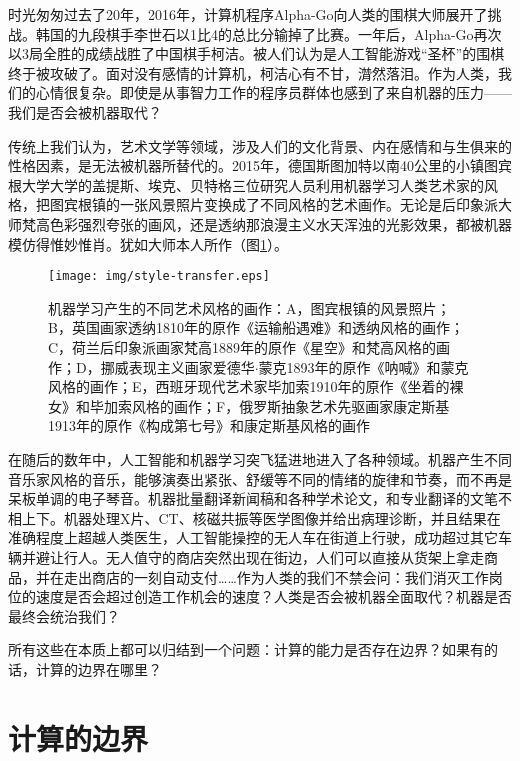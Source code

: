 \documentclass{article}
\begin{document}
时光匆匆过去了20年，2016年，计算机程序Alpha-Go向人类的围棋大师展开了挑战。韩国的九段棋手李世石以1比4的总比分输掉了比赛。一年后，Alpha-Go再次以3局全胜的成绩战胜了中国棋手柯洁。被人们认为是人工智能游戏“圣杯”的围棋终于被攻破了。面对没有感情的计算机，柯洁心有不甘，潸然落泪。作为人类，我们的心情很复杂。即使是从事智力工作的程序员群体也感到了来自机器的压力——我们是否会被机器取代？

传统上我们认为，艺术文学等领域，涉及人们的文化背景、内在感情和与生俱来的性格因素，是无法被机器所替代的。2015年，德国斯图加特以南40公里的小镇图宾根大学大学的盖提斯、埃克、贝特格三位研究人员利用机器学习人类艺术家的风格，把图宾根镇的一张风景照片变换成了不同风格的艺术画作\cite{Gatys-2015}。无论是后印象派大师梵高色彩强烈夸张的画风，还是透纳那浪漫主义水天浑浊的光影效果，都被机器模仿得惟妙惟肖。犹如大师本人所作（图\ref{fig:style-transfer}）。

\begin{figure}[htbp]
 \centering
 \texttt{[image: img/style-transfer.eps]}
 \caption{机器学习产生的不同艺术风格的画作：A，图宾根镇的风景照片；B，英国画家透纳1810年的原作《运输船遇难》和透纳风格的画作；C，荷兰后印象派画家梵高1889年的原作《星空》和梵高风格的画作；D，挪威表现主义画家爱德华$\cdot$蒙克1893年的原作《呐喊》和蒙克风格的画作；E，西班牙现代艺术家毕加索1910年的原作《坐着的裸女》和毕加索风格的画作；F，俄罗斯抽象艺术先驱画家康定斯基1913年的原作《构成第七号》和康定斯基风格的画作}
 \label{fig:style-transfer}
\end{figure}

在随后的数年中，人工智能和机器学习突飞猛进地进入了各种领域。机器产生不同音乐家风格的音乐，能够演奏出紧张、舒缓等不同的情绪的旋律和节奏，而不再是呆板单调的电子琴音。机器批量翻译新闻稿和各种学术论文，和专业翻译的文笔不相上下。机器处理X片、CT、核磁共振等医学图像并给出病理诊断，并且结果在准确程度上超越人类医生，人工智能操控的无人车在街道上行驶，成功超过其它车辆并避让行人。无人值守的商店突然出现在街边，人们可以直接从货架上拿走商品，并在走出商店的一刻自动支付……作为人类的我们不禁会问：我们消灭工作岗位的速度是否会超过创造工作机会的速度？人类是否会被机器全面取代？机器是否最终会统治我们？

所有这些在本质上都可以归结到一个问题：计算的能力是否存在边界？如果有的话，计算的边界在哪里？

\section{计算的边界}
\end{document}
